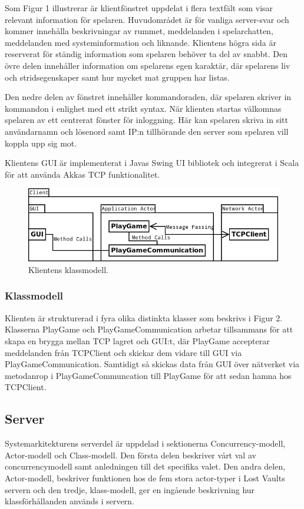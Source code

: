 \documentclass[a4paper]{article}
\begin{document}
Som Figur 1 illustrerar är klientfönstret uppdelat i flera textfält som visar relevant information för spelaren. Huvudområdet är för vanliga server-svar och kommer innehålla beskrivningar 
av rummet, meddelanden i spelarchatten, meddelanden med systeminformation och liknande. Klientens högra sida är reserverat för ständig information som spelaren behöver ta del av snabbt. 
Den övre delen innehåller information om spelarens egen karaktär, där spelarens liv och stridsegenskaper samt hur mycket mat gruppen har listas. 

Den nedre delen av fönstret innehåller kommandoraden, där spelaren skriver in kommandon i enlighet med ett strikt syntax. När klienten startas välkomnas spelaren 
av ett centrerat fönster för inloggning. Här kan spelaren skriva in sitt användarnamn och lösenord samt IP:n tillhörande den server som spelaren vill koppla upp sig mot. 

Klientens GUI är implementerat i Javas Swing UI bibliotek och integrerat i Scala för att använda Akkas TCP funktionalitet.

\begin{figure}[hbt]
\centering
\includegraphics[width=1.0\textwidth]{clientuml1}
\caption{\label{fig:ClientArch}Klientens klassmodell.}
\end{figure}
    
\subsubsection{Klassmodell}
Klienten är strukturerad i fyra olika distinkta klasser som beskrivs i Figur 2. Klasserna PlayGame och PlayGameCommunication arbetar 
tillsammans för att skapa en brygga mellan TCP lagret och GUI:t, där PlayGame accepterar meddelanden från TCPClient och skickar dem 
vidare till GUI via PlayGameCommunication. Samtidigt så skickas data från GUI över nätverket via metodanrop i PlayGameCommuncation till 
PlayGame för att sedan hamna hos TCPClient.

\subsection{Server}
Systemarkitekturens serverdel är uppdelad i sektionerna Concurrency-modell, Actor-modell och Class-modell. Den första delen beskriver vårt 
val av concurrencymodell samt anledningen till det specifika valet. Den andra delen, Actor-modell, beskriver funktionen hos de fem stora actor-typer i Lost Vaults servern och 
den tredje, klass-modell, ger en ingående beskrivning hur klassförhållanden används i servern.
\end{document}
